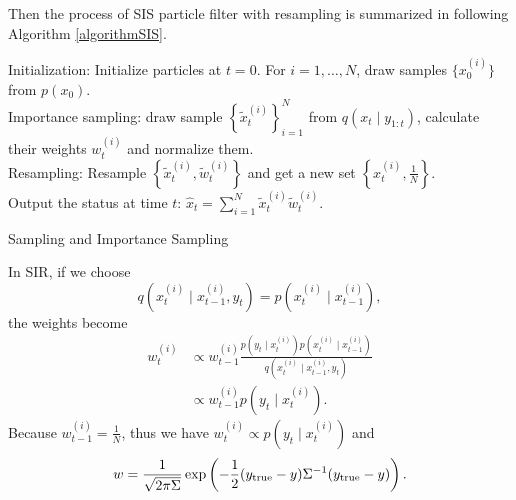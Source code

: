 Then the process of SIS particle filter with resampling is summarized in following Algorithm \ref{algorithmSIS}. 
\begin{algorithm}[h]
\SetAlgoLined 
Initialization: Initialize particles at $t=0$. For $i=1, \ldots, N$, draw samples $\lbrace x_0^{(i)}\rbrace$ from $p(x_0)$.\\
 {Importance sampling: draw sample $\left\lbrace \tilde{x}_t^{(i)}\right\rbrace_{i=1}^N$ from $q(x_t \mid y_{1:t})$, calculate their weights $w_t^{(i)}$ and normalize them. \\
Resampling: Resample $\left\lbrace \tilde{x}_t^{(i)}, \tilde{w}_t^{(i)}\right\rbrace$ and get a new set $\left\lbrace x_t^{(i)},\frac{1}{N}\right\rbrace$.\\
Output the status at time $t$: $\hat{x}_t =\sum_{i=1}^{N}\tilde{x}_t^{(i)}\tilde{w}_t^{(i)}$.}
 \caption{Sampling and Importance Sampling}\label{algorithmSIS}
\end{algorithm}


In SIR, if we choose
\begin{equation}
q\left(x_t^{(i)}\mid x_{t-1}^{(i)},y_t\right) = p\left(x_t^{(i)}\mid x_{t-1}^{(i)}\right),
\end{equation}
the weights become
\begin{equation}
\begin{split}
w_t^{(i)}&\propto w_{t-1}^{(i)}\frac{ p\left(y_t \mid x_{t}^{(i)}\right) p\left(x_t^{(i)}\mid x_{t-1}^{(i)}\right)}{q\left(x_t^{(i)}\mid x_{t-1}^{(i)},y_t \right)}\\
&\propto w_{t-1}^{(i)}p\left(y_t \mid x_{t}^{(i)}\right).
\end{split}
\end{equation}
Because $w_{t-1}^{(i)}=\frac{1}{N}$, thus we have $w_t^{(i)} \propto p\left(y_t \mid x_{t}^{(i)}\right)$ and
\begin{equation}
w=\frac{1}{\sqrt{2\pi\Sigma}}\exp\left(-\frac{1}{2} (y_{\mbox{\scriptsize true}}-y)\Sigma^{-1}(y_{\mbox{\scriptsize true}}-y)\right).
\end{equation}

